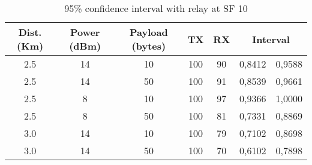 \begin{table}[H]
\centering
\caption{95\% confidence interval with relay at SF 10}
\label{tab:cisf10relay}
\begin{tabular}{@{}ccccccc@{}}
\toprule
Dist. (Km) & Power (dBm) & Payload (bytes) & TX  & RX & \multicolumn{2}{c}{Interval} \\ \midrule
2.5           & 14          & 10              & 100 & 90 & 0,8412        & 0,9588       \\
2.5           & 14          & 50              & 100 & 91 & 0,8539        & 0,9661       \\
2.5          & 8           & 10              & 100 & 97 & 0,9366        & 1,0000       \\
2.5           & 8           & 50              & 100 & 81 & 0,7331        & 0,8869       \\
3.0           & 14          & 10              & 100 & 79 & 0,7102        & 0,8698       \\
3.0           & 14          & 50              & 100 & 70 & 0,6102        & 0,7898       \\ \bottomrule
\end{tabular}
\end{table}